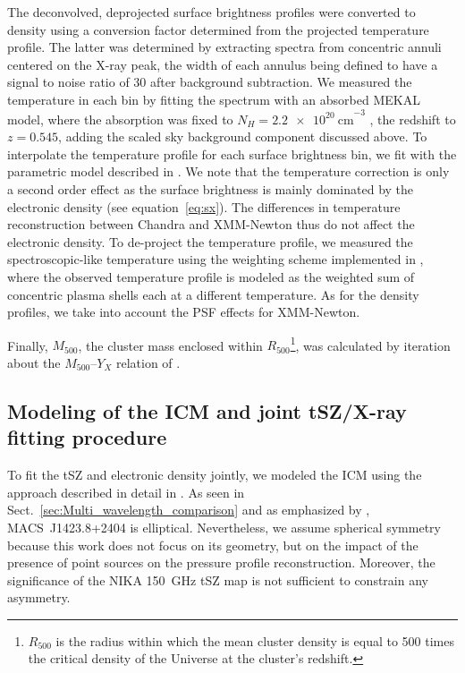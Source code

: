 \documentclass[twocolumn,traditabstract]{aa}
\begin{document}
The deconvolved, deprojected surface brightness profiles were converted to density using a conversion factor determined from the projected temperature profile. The latter was determined by extracting spectra from concentric annuli centered on the X-ray peak, the width of each annulus being defined to have a signal to noise ratio of $30$ after background subtraction. We measured the temperature in each bin by fitting the spectrum with an absorbed {\sc MEKAL} model, where the absorption was fixed to $N_{H}=\SI{2.2e20}{\centi\meter}^{-3}$ \citep{kalberla2005}, the redshift to $z=0.545$, adding the scaled sky background component discussed above. To interpolate the temperature profile for each surface brightness bin, we fit with the parametric model described in \cite{vikhlinin2006}. We note that the temperature correction is only a second order effect as the surface brightness is mainly dominated by the electronic density (see equation~\ref{eq:sx}). The differences in temperature reconstruction between Chandra and XMM-Newton \citep[e.g.,][]{sch15} thus do not affect the electronic density. To de-project the temperature profile, we measured the spectroscopic-like temperature \citep{mazzotta2004} using the weighting scheme implemented in \cite{vikh_multit}, where the observed temperature profile is modeled as the weighted sum of concentric plasma shells each at a different temperature. As for the density profiles, we take into account the PSF effects for XMM-Newton. 

Finally, $M_{500}$, the cluster mass enclosed within $R_{500}$\footnote{$R_{500}$ is the radius within which the mean cluster density is equal to 500 times the critical density of the Universe at the cluster's redshift.}, was calculated by iteration about the $M_{500}$--$Y_X$ relation of \cite{arnaud2010}.

\subsection{Modeling of the ICM and joint tSZ/X-ray fitting procedure}\label{sec:modeling}
To fit the tSZ and electronic density jointly, we modeled the ICM using the approach described in detail in \cite{adam2014}. As seen in Sect.~\ref{sec:Multi_wavelength_comparison} and as emphasized by \cite{morandi2010}, \mbox{MACS~J1423.8+2404} is elliptical. Nevertheless, we assume spherical symmetry because this work does not focus on its geometry, but on the impact of the presence of point sources on the pressure profile reconstruction. Moreover, the significance of the NIKA 150~GHz tSZ map is not sufficient to constrain any asymmetry. 
\end{document}
